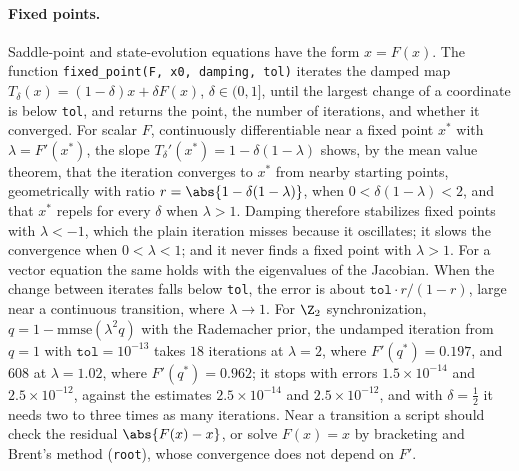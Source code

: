 \begin{refsection}
\paragraph{Fixed points.} Saddle-point and state-evolution equations have the form $x=F(x)$. The function \texttt{fixed\_\allowbreak point(F, x0, damping, tol)} iterates the damped map $T_\delta(x)=(1-\delta)x+\delta F(x)$, $\delta\in(0,1]$, until the largest change of a coordinate is below \texttt{tol}, and returns the point, the number of iterations, and whether it converged. For scalar $F$, continuously differentiable near a fixed point $x^*$ with $\lambda=F'(x^*)$, the slope $T_\delta'(x^*)=1-\delta(1-\lambda)$ shows, by the mean value theorem, that the iteration converges to $x^*$ from nearby starting points, geometrically with ratio $r=\abs{1-\delta(1-\lambda)}$, when $0<\delta(1-\lambda)<2$, and that $x^*$ repels for every $\delta$ when $\lambda>1$. Damping therefore stabilizes fixed points with $\lambda<-1$, which the plain iteration misses because it oscillates; it slows the convergence when $0<\lambda<1$; and it never finds a fixed point with $\lambda>1$. For a vector equation the same holds with the eigenvalues of the Jacobian. When the change between iterates falls below \texttt{tol}, the error is about $\mathtt{tol}\cdot r/(1-r)$, large near a continuous transition, where $\lambda\to1$. For $\Z_2$ synchronization, $q=1-\mathrm{mmse}(\lambda^2q)$ with the Rademacher prior, the undamped iteration from $q=1$ with $\mathtt{tol}=10^{-13}$ takes $18$ iterations at $\lambda=2$, where $F'(q^*)=0.197$, and $608$ at $\lambda=1.02$, where $F'(q^*)=0.962$; it stops with errors $1.5\times10^{-14}$ and $2.5\times10^{-12}$, against the estimates $2.5\times10^{-14}$ and $2.5\times10^{-12}$, and with $\delta=\frac12$ it needs two to three times as many iterations. Near a transition a script should check the residual $\abs{F(x)-x}$, or solve $F(x)=x$ by bracketing and Brent's method (\texttt{root}), whose convergence does not depend on $F'$.


\end{refsection}
